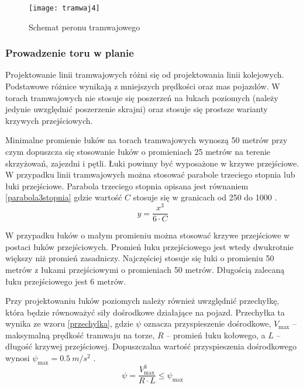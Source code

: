 \documentclass[twoside,12pt]{article}
\begin{document}
		\begin{figure}[H]
		\centering
		\texttt{[image: tramwaj4]}\\
		\caption{Schemat peronu tramwajowego}
		\label{tramwaj4}
	\end{figure}	
	
	\subsubsection{Prowadzenie toru w planie}
	
	Projektowanie linii tramwajowych różni się od projektowania linii kolejowych. Podstawowe różnice wynikają z mniejszych prędkości oraz mas pojazdów. W torach tramwajowych nie stosuje się poszerzeń na łukach poziomych (należy jedynie uwzględnić poszerzenie skrajni) oraz stosuje się prostsze warianty krzywych przejściowych.
	
	Minimalne promienie łuków na torach tramwajowych wynoszą 50 metrów przy czym dopuszcza się stosowanie łuków o promieniach 25 metrów na terenie skrzyżowań, zajezdni i pętli. Łuki powinny być wyposażone w krzywe przejściowe. W przypadku linii tramwajowych można stosować parabole trzeciego stopnia lub łuki przejściowe. Parabola trzeciego stopnia opisana jest równaniem \ref{parabola3stopnia} gdzie wartość $C$ stosuje się w granicach od 250 do 1000 \cite{tory_tramwajowe}. 
	\begin{equation}\label{parabola3stopnia}
	y= \frac{x^3}{6\cdot C}
	\end{equation}
	
	W przypadku łuków o małym promieniu można stosować krzywe przejściowe w postaci łuków przejściowych. Promień łuku przejściowego jest wtedy dwukrotnie większy niż promień zasadniczy. Najczęściej stosuje się łuki o promieniu 50 metrów z łukami przejściowymi o promieniach 50 metrów. Długością zalecaną łuku przejściowego jest 6 metrów.
	
	Przy projektowaniu łuków poziomych należy również uwzględnić przechyłkę, która będzie równoważyć siły dośrodkowe działające na pojazd. Przechyłka ta wynika ze wzoru \ref{przechylka}, gdzie $\psi$ oznacza przyspieszenie dośrodkowe, $V_{\max}$ -- maksymalną prędkość tramwaju na torze, $R$ -- promień łuku kołowego, a $L$ -- długość krzywej przejściowej. Dopuszczalna wartość przyspieszenia dośrodkowego wynosi $\psi_{\max} = \SI{0.5}{m/s^2}$ \cite{tory_tramwajowe}.
	\begin{equation}\label{przechylka}
	\psi = \frac{V_{\max}^3}{R\cdot L} \leq \psi_{\max}
	\end{equation}
	
\end{document}
